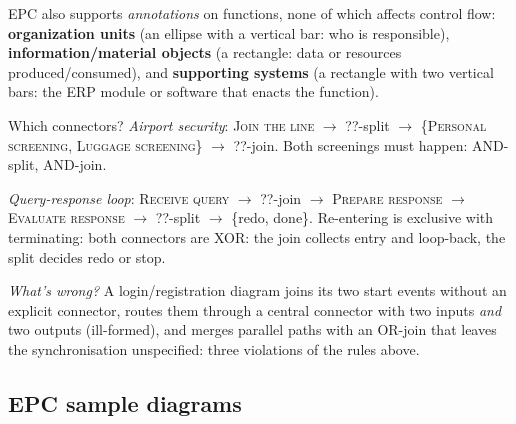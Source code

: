 EPC also supports \emph{annotations} on functions, none of which affects control flow: \textbf{organization units} (an ellipse with a vertical bar: who is responsible), \textbf{information/material objects} (a rectangle: data or resources produced/consumed), and \textbf{supporting systems} (a rectangle with two vertical bars: the ERP module or software that enacts the function).

\begin{examplebox}{Which connectors?}
\emph{Airport security}: \textsc{Join the line} $\to$ ??-split $\to$ \{\textsc{Personal screening}, \textsc{Luggage screening}\} $\to$ ??-join. Both screenings must happen: AND-split, AND-join.
\par\smallskip
\emph{Query-response loop}: \textsc{Receive query} $\to$ ??-join $\to$ \textsc{Prepare response} $\to$ \textsc{Evaluate response} $\to$ ??-split $\to$ \{redo, done\}. Re-entering is exclusive with terminating: both connectors are XOR: the join collects entry and loop-back, the split decides redo or stop.
\par\smallskip
\emph{What's wrong?} A login/registration diagram joins its two start events without an explicit connector, routes them through a central connector with two inputs \emph{and} two outputs (ill-formed), and merges parallel paths with an OR-join that leaves the synchronisation unspecified: three violations of the rules above.
\end{examplebox}

\subsection{EPC sample diagrams}

